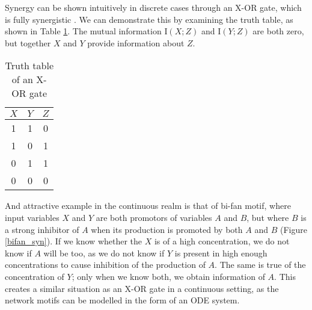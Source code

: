 \documentclass[../main.tex]{subfiles}
\begin{document}
Synergy can be shown intuitively in discrete cases through an X-OR gate, which is fully synergistic \cite{quax2017quantifying}.
We can demonstrate this by examining the truth table, as shown in Table \ref{XOR}.
The mutual information $\mathrm{I}(X;Z)$ and $\mathrm{I}(Y;Z)$ are both zero, but together $X$ and $Y$ provide information about $Z$.

\begin{table}
\begin{center}
\begin{tabular}{|c|c||c|}
\hline
$X$ & $Y$ & $Z$ \\
\hline
\hline
1 & 1 & 0 \\
1 & 0 & 1 \\
0 & 1 & 1 \\
0 & 0 & 0 \\
\hline
\end{tabular}
\end{center}
\caption{Truth table of an X-OR gate}
\label{XOR}
\end{table}

And attractive example in the continuous realm is that of bi-fan motif, where input variables $X$ and $Y$ are both promotors of variables $A$ and $B$, but where $B$ is a strong inhibitor of $A$ when its production is promoted by both $A$ and $B$ (Figure \ref{bifan_syn}).
If we know whether the $X$ is of a high concentration, we do not know if $A$ will be too, as we do not know if $Y$ is present in high enough concentrations to cause inhibition of the production of $A$.
The same is true of the concentration of $Y$; only when we know both, we obtain information of $A$.
This creates a similar situation as an X-OR gate in a continuous setting, as the network motifs can be modelled in the form of an ODE system.
\end{document}
